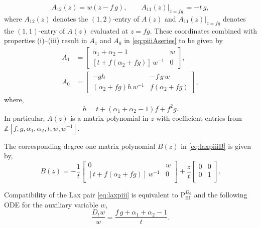 \documentclass[a4paper,reqno]{amsart}
\numberwithin{equation}{section}
\numberwithin{figure}{section}
\theoremstyle{remark}
\newcommand\Pthree{\textrm{P}_{\textrm{III}}}
\begin{document}
\begin{equation*}
    A_{12}(z)=w(z-f\,g),\qquad A_{11}(z)|_{z=fg}\,=-t\,g,
\end{equation*}
where $A_{12}(z)$ denotes the $(1,2)$-entry of $A(z)$ and $A_{11}(z)|_{z=fg}$ denotes the $(1,1)$-entry of $A(z)$ evaluated at $z=fg$. 
These coordinates combined with properties (i)--(iii) result in $A_1$ and $A_0$ in \eqref{eq:piiiAseries} to be given by
\begin{align*}
A_1&=\begin{bmatrix}
 \alpha_1+\alpha_2-1 & w\\
 [t+f(\alpha_2+fg)]\,w^{-1} & 0
\end{bmatrix},\\
A_0&=\begin{bmatrix}
-gh & -f\, g\, w\\
(\alpha_2+fg)h\,w^{-1}& f(\alpha_2+fg)
\end{bmatrix},
\end{align*}
where,
\[ h = t+(\alpha_1+\alpha_2-1)f+f^2g.\]
In particular, $A(z)$ is a matrix polynomial in $z$ with coefficient entries from $\mathbb{Z}[f,g,\alpha_1,\alpha_2,t,w,w^{-1}]$.


The corresponding degree one matrix polynomial $B(z)$ in \eqref{eq:laxpiiiB} is given by,
\begin{equation*}
    B(z)=-\frac{1}{t}\begin{bmatrix}
 0 & w \\
 [t+f(\alpha_2+fg)]\,w^{-1} & 0 \\
\end{bmatrix}+\frac{z}{t}\begin{bmatrix}
 0 & 0 \\
 0 & 1\\
\end{bmatrix}.
\end{equation*}



Compatibility of the Lax pair \eqref{eq:laxpiii} is equivalent to $\Pthree^{D_6}$ and the following ODE for the auxiliary variable $w$,
\begin{equation*}
    \frac{D_tw}{w}=\frac{f\,g+\alpha_1+\alpha_2-1}{t}.
\end{equation*}
\end{document}
